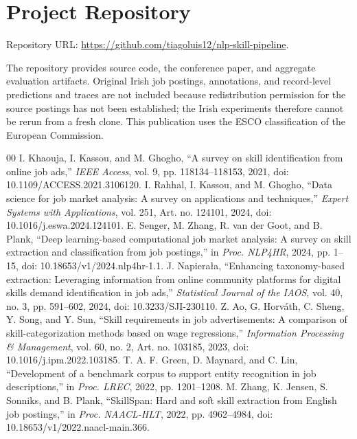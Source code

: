 \documentclass[conference]{IEEEtran}
\begin{document}
\appendices
\section{Project Repository}

Repository URL: \url{https://github.com/tiagoluis12/nlp-skill-pipeline}.

The repository provides source code, the conference paper, and aggregate evaluation artifacts. Original Irish job postings, annotations, and record-level predictions and traces are not included because redistribution permission for the source postings has not been established; the Irish experiments therefore cannot be rerun from a fresh clone. This publication uses the ESCO classification of the European Commission.

\begin{thebibliography}{00}
 I. Khaouja, I. Kassou, and M. Ghogho, ``A survey on skill identification from online job ads,'' \emph{IEEE Access}, vol. 9, pp. 118134--118153, 2021, doi: 10.1109/ACCESS.2021.3106120.
 I. Rahhal, I. Kassou, and M. Ghogho, ``Data science for job market analysis: A survey on applications and techniques,'' \emph{Expert Systems with Applications}, vol. 251, Art. no. 124101, 2024, doi: 10.1016/j.eswa.2024.124101.
 E. Senger, M. Zhang, R. van der Goot, and B. Plank, ``Deep learning-based computational job market analysis: A survey on skill extraction and classification from job postings,'' in \emph{Proc. NLP4HR}, 2024, pp. 1--15, doi: 10.18653/v1/2024.nlp4hr-1.1.
 J. Napiera\l{}a, ``Enhancing taxonomy-based extraction: Leveraging information from online community platforms for digital skills demand identification in job ads,'' \emph{Statistical Journal of the IAOS}, vol. 40, no. 3, pp. 591--602, 2024, doi: 10.3233/SJI-230110.
 Z. Ao, G. Horv\'ath, C. Sheng, Y. Song, and Y. Sun, ``Skill requirements in job advertisements: A comparison of skill-categorization methods based on wage regressions,'' \emph{Information Processing \& Management}, vol. 60, no. 2, Art. no. 103185, 2023, doi: 10.1016/j.ipm.2022.103185.
 T. A. F. Green, D. Maynard, and C. Lin, ``Development of a benchmark corpus to support entity recognition in job descriptions,'' in \emph{Proc. LREC}, 2022, pp. 1201--1208.
 M. Zhang, K. Jensen, S. Sonniks, and B. Plank, ``SkillSpan: Hard and soft skill extraction from English job postings,'' in \emph{Proc. NAACL-HLT}, 2022, pp. 4962--4984, doi: 10.18653/v1/2022.naacl-main.366.

\end{thebibliography}
\end{document}
